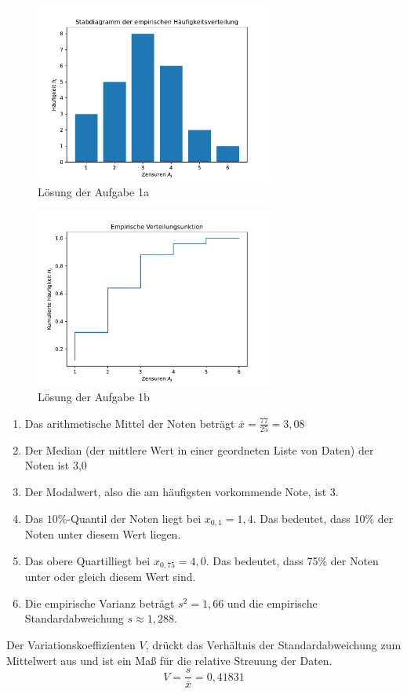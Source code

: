 \documentclass[main.tex]{subfiles}
\begin{document}
\begin{figure}[h]
    \begin{center}
        \includegraphics[width=0.7\textwidth]{A1-a.pdf}
        \caption{Lösung der Aufgabe 1a}
    \end{center}
\end{figure}

\begin{figure}[h!]
    \begin{center}
        \includegraphics[width=0.7\textwidth]{A1-b.pdf}
        \caption{Lösung der Aufgabe 1b}
    \end{center}
\end{figure}
\renewcommand{\labelenumi}{\theenumi}
\renewcommand{\theenumi}{\roman{enumi}.}%
\begin{enumerate}
    \item Das arithmetische Mittel der Noten beträgt $\overline{x}=\frac{77}{25} = 3,08$
    \item Der Median (der mittlere Wert in einer geordneten Liste von Daten) der Noten ist 3,0
    \item Der Modalwert, also die am häufigsten vorkommende Note, ist 3.
    \item Das $10\%$-Quantil der Noten liegt bei $x_{0,1} = 1,4$. Das bedeutet, dass 10\% der Noten unter diesem Wert liegen.
    \item Das obere Quartilliegt bei $x_{0,75} = 4,0$. Das bedeutet, dass 75\% der Noten unter oder gleich diesem Wert sind.
    \item Die empirische Varianz beträgt $s^2 = 1,66$ und die empirische Standardabweichung $s \approx 1,288$.
\end{enumerate}

Der Variationskoeffizienten $V$, drückt das Verhältnis der Standardabweichung zum Mittelwert aus und ist ein Maß für die relative Streuung der Daten.
$$
    V = \frac{s}{\overline{x}} = 0,41831
$$
\end{document}
